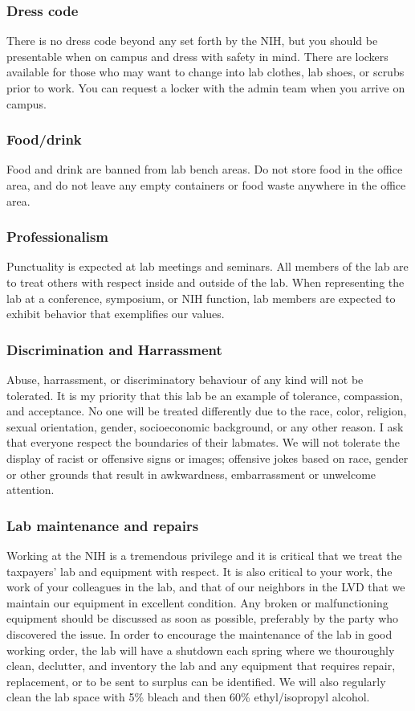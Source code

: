 \documentclass[10pt, a4paper, twocolumn]{article} %
\begin{document}
\subsubsection{Dress code} There is no dress code beyond any set forth by the NIH, but you should be presentable when on campus and dress with safety in mind. There are lockers available for those who may want to change into lab clothes, lab shoes, or scrubs prior to work. You can request a locker with the admin team when you arrive on campus.

\subsubsection{Food/drink} Food and drink are banned from lab bench areas. Do not store food in the office area, and do not leave any empty containers or food waste anywhere in the office area.

\subsubsection{Professionalism}
Punctuality is expected at lab meetings and seminars. All members of the lab are to treat others with respect inside and outside of the lab. When representing the lab at a conference, symposium, or NIH function, lab members are expected to exhibit behavior that exemplifies our values.

\subsubsection{Discrimination and Harrassment}
Abuse, harrassment, or discriminatory behaviour of any kind will not be tolerated. It is my priority that this lab be an example of tolerance, compassion, and acceptance. No one will be treated differently due to the race, color, religion, sexual orientation, gender, socioeconomic background, or any other reason. I ask that everyone respect the boundaries of their labmates. We will not tolerate the display of racist or offensive signs or images; offensive jokes based on race, gender or other grounds that result in awkwardness, embarrassment or unwelcome attention.

\subsubsection{Lab maintenance and repairs}
Working at the NIH is a tremendous privilege and it is critical that we treat the taxpayers' lab and equipment with respect. It is also critical to your work, the work of your colleagues in the lab, and that of our neighbors in the LVD that we maintain our equipment in excellent condition. Any broken or malfunctioning equipment should be discussed as soon as possible, preferably by the party who discovered the issue.
In order to encourage the maintenance of the lab in good working order, the lab will have a shutdown each spring where we thouroughly clean, declutter, and inventory the lab and any equipment that requires repair, replacement, or to be sent to surplus can be identified. We will also regularly clean the lab space with 5\% bleach and then 60\% ethyl/isopropyl alcohol.
\end{document}
